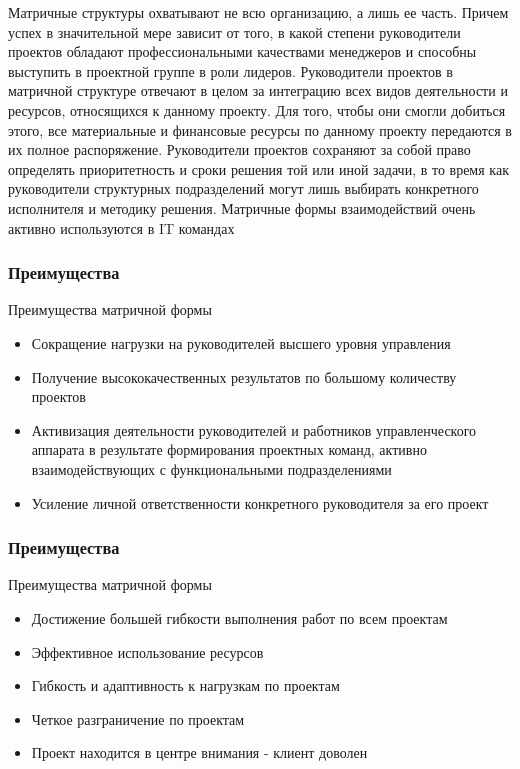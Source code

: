 \documentclass{../industrial-development}
\begin{document}
\lecturenotes
Матричные структуры охватывают не всю организацию, а лишь ее часть. Причем успех в значительной мере зависит от того, в какой степени руководители проектов обладают профессиональными качествами менеджеров и способны выступить в проектной группе в роли лидеров.
Руководители проектов в матричной структуре отвечают в целом за интеграцию всех видов деятельности и ресурсов, относящихся к данному проекту. Для того, чтобы они смогли добиться этого, все материальные и финансовые ресурсы по данному проекту передаются в их полное распоряжение. Руководители проектов сохраняют за собой право определять приоритетность и сроки решения той или иной задачи, в то время как руководители структурных подразделений могут лишь выбирать конкретного исполнителя и методику решения.
Матричные формы взаимодействий очень активно используются в IT  командах

\begin{frame} \frametitle{Преимущества}
  \begin{block}{Преимущества матричной формы}
  \end{block}
  
  \begin{itemize}
  \item Сокращение нагрузки на руководителей высшего уровня управления 
  \item Получение высококачественных результатов по большому количеству проектов
  \item Активизация деятельности руководителей и работников управленческого аппарата в результате формирования проектных команд, активно взаимодействующих с функциональными подразделениями
  \item Усиление личной ответственности конкретного руководителя за его проект
  \end{itemize}
\end{frame}

\begin{frame} \frametitle{Преимущества}
  \begin{block}{Преимущества матричной формы}
  \end{block}
  
  \begin{itemize}
 \item Достижение большей гибкости выполнения работ по всем проектам
 \item Эффективное использование ресурсов
 \item Гибкость и адаптивность к нагрузкам по проектам
 \item Четкое разграничение по проектам
 \item Проект находится в центре внимания - клиент доволен
  \end{itemize}
\end{frame}
\end{document}
